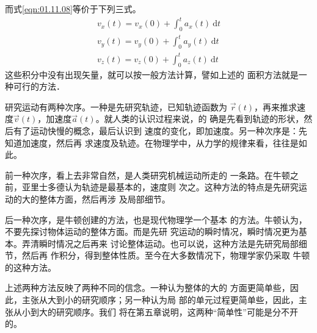 \documentclass[../outline-of-mechanics.tex]{subfiles}
\begin{document}
而式\eqref{eqn:01.11.08}等价于下列三式。
{%
\begin{equation}\label{eqn:01.11.10}
  \begin{aligned}
    v_x\left(t\right)=v_x\left(0\right)+\int_{0}^{t} a_{x}\left(t\right) {~\mathrm d} t \\
    v_y\left(t\right)=v_y\left(0\right)+\int_{0}^{t} a_{y}\left(t\right) {~\mathrm d} t \\
    v_z\left(t\right)=v_z\left(0\right)+\int_{0}^{t} a_{z}\left(t\right) {~\mathrm d} t
  \end{aligned}
\end{equation}}%
这些积分中没有出现矢量，就可以按一般方法计算，譬如上述的
面积方法就是一种可行的方法．

研究运动有两种次序。一种是先研究轨迹，已知轨迹函数为
$\vec{r}\left(t\right)$，再来推求速度$\vec{v}\left(t\right)$，加速度$\vec{a}\left(t\right)$。就人类的认识过程来说，的
确是先看到轨迹的形状，然后有了运动快慢的概念，最后认识到
速度的变化，即加速度。另一种次序是：先知道加速度，然后再
求速度及轨迹。在物理学中，从力学的规律来看，往往是如此。

前一种次序，看上去非常自然，是人类研究机械运动所走的
一条路。在牛顿之前，亚里士多德认为轨迹是最基本的，速度则
次之。这种方法的特点是先研究运动的大的整体方面，然后再涉
及局部细节。

后一种次序，是牛顿创建的方法，也是现代物理学一个基本
的方法。牛顿认为，不要先探讨物体运动的整体方面。而是先研
究运动的瞬时情况，瞬时情况更为基本。弄清瞬时情况之后再来
讨论整体运动。也可以说，这种方法是先研究局部细节，然后再
作积分，得到整体性质。至今在大多数情况下，物理学家仍采取
牛顿的这种方法。

上述两种方法反映了两种不同的信念。一种认为整体的大的
方面更简单些，因此，主张从大到小的研究顺序；另一种认为局
部的单元过程更简单些，因此，主张从小到大的研究顺序。我们
将在第五章说明，这两种“简单性”可能是分不开的。
\end{document}

